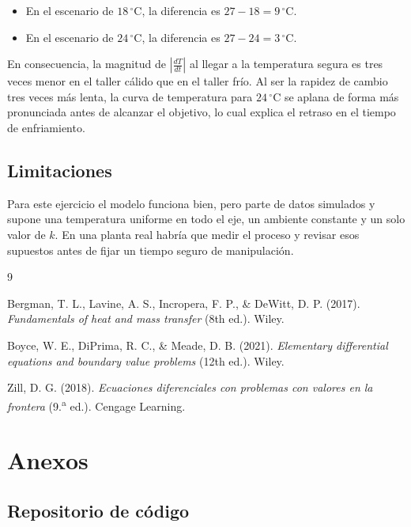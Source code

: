 \documentclass[11pt,onecolumn,letterpaper]{article}
\begin{document}
\begin{itemize}
    \item En el escenario de \(18\,^{\circ}\mathrm{C}\), la diferencia es \(27-18=9\,^{\circ}\mathrm{C}\).
    \item En el escenario de \(24\,^{\circ}\mathrm{C}\), la diferencia es \(27-24=3\,^{\circ}\mathrm{C}\).
\end{itemize}

En consecuencia, la magnitud de \(\left|\frac{dT}{dt}\right|\) al llegar a la temperatura segura es tres veces menor en el taller cálido que en el taller frío. Al ser la rapidez de cambio tres veces más lenta, la curva de temperatura para \(24\,^{\circ}\mathrm{C}\) se aplana de forma más pronunciada antes de alcanzar el objetivo, lo cual explica el retraso en el tiempo de enfriamiento.

\subsection{Limitaciones}

Para este ejercicio el modelo funciona bien, pero parte de datos simulados y supone una temperatura uniforme en todo el eje, un ambiente constante y un solo valor de \(k\). En una planta real habría que medir el proceso y revisar esos supuestos antes de fijar un tiempo seguro de manipulación.

\begin{thebibliography}{9}

Bergman, T. L., Lavine, A. S., Incropera, F. P., \& DeWitt, D. P. (2017).
\textit{Fundamentals of heat and mass transfer} (8th ed.). Wiley.

Boyce, W. E., DiPrima, R. C., \& Meade, D. B. (2021).
\textit{Elementary differential equations and boundary value problems} (12th ed.). Wiley.

Zill, D. G. (2018).
\textit{Ecuaciones diferenciales con problemas con valores en la frontera} (9.\textsuperscript{a} ed.). Cengage Learning.

\end{thebibliography}

\section{Anexos}

\subsection{Repositorio de código}
\end{document}
